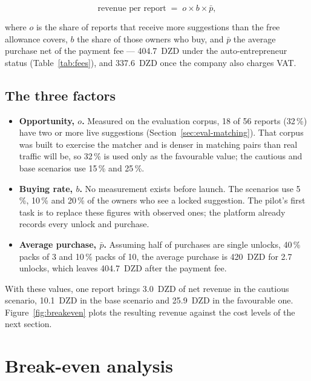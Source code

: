 \begin{equation}
\text{revenue per report} \;=\; o \times b \times \bar{p},
\label{eq:revenue}
\end{equation}

\noindent where $o$ is the share of reports that receive more suggestions than
the free allowance covers, $b$ the share of those owners who buy, and $\bar{p}$
the average purchase net of the payment fee --- 404.7~DZD under the
auto-entrepreneur status (Table~\ref{tab:fees}), and 337.6~DZD once the company
also charges VAT.

\subsection{The three factors}
\label{sec:revenue-factors}

\begin{itemize}[leftmargin=1.4em,itemsep=3pt]
  \item \textbf{Opportunity, $o$.} Measured on the evaluation corpus, 18 of 56
        reports (32\,\%) have two or more live suggestions
        (Section~\ref{sec:eval-matching}). That corpus was built to exercise
        the matcher and is denser in matching pairs than real traffic will be,
        so 32\,\% is used only as the favourable value; the cautious and base
        scenarios use 15\,\% and 25\,\%.
  \item \textbf{Buying rate, $b$.} No measurement exists before launch. The
        scenarios use 5\,\%, 10\,\% and 20\,\% of the owners who see a locked
        suggestion. The pilot's first task is to replace these figures with
        observed ones; the platform already records every unlock and purchase.
  \item \textbf{Average purchase, $\bar{p}$.} Assuming half of purchases are
        single unlocks, 40\,\% packs of 3 and 10\,\% packs of 10, the average
        purchase is 420~DZD for 2.7 unlocks, which leaves 404.7~DZD after the
        payment fee.
\end{itemize}

With these values, one report brings 3.0~DZD of net revenue in the cautious
scenario, 10.1~DZD in the base scenario and 25.9~DZD in the favourable one.
Figure~\ref{fig:breakeven} plots the resulting revenue against the cost levels
of the next section.

\section{Break-even analysis}


